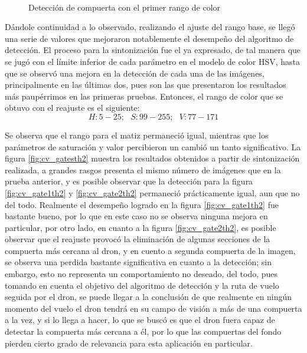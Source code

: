 \begin{figure}[ht]
    \centering
    \hfill
    \\
    \hfill
    \hfill

    \caption{Detección de compuerta con el primer rango de color}
    \label{fig:cv_gatesth1}
\end{figure}

Dándole continuidad a lo observado, realizando el ajuste del rango base, se llegó una serie de valores que mejoraron notablemente el desempeño del algoritmo de detección. El proceso para la sintonización fue el ya expresado, de tal manera que se jugó con el límite inferior de cada parámetro en el modelo de color HSV, hasta que se observó una mejora en la detección de cada una de las imágenes, principalmente en las últimas dos, pues son las que presentaron los resultados más paupérrimos en las primeras pruebas. Entonces, el rango de color que se obtuvo con el reajuste es el siguiente: \[H:5-25;\text{ } S:99-255;\text{ } V:77-171\]

Se observa que el rango para el matiz permaneció igual, mientras que los parámetros de saturación y valor percibieron un cambió un tanto significativo. La figura \ref{fig:cv_gatesth2} muestra los resultados obtenidos a partir de sintonización realizada, a grandes rasgos presenta el mismo número de imágenes que en la prueba anterior, y es posible observar que la detección para la figura \ref{fig:cv_gate1th2} y \ref{fig:cv_gate2th2} permaneció prácticamente igual, aun que no del todo. Realmente el desempeño logrado en la figura \ref{fig:cv_gate1th2} fue bastante bueno, por lo que en este caso no se observa ninguna mejora en particular, por otro lado, en cuanto a la figura \ref{fig:cv_gate2th2}, es posible observar que el reajuste provocó la eliminación de algunas secciones de la compuerta más cercana al dron, y en cuento a segunda compuerta de la imagen, se observa una perdida bastante significativa en cuanto a la detección; sin embargo, esto no representa un comportamiento no deseado, del todo, pues tomando en cuenta el objetivo del algoritmo de detección y la ruta de vuelo seguida por el dron, se puede llegar a la conclusión de que realmente en ningún momento del vuelo el dron tendrá en su campo de visión a más de una compuerta a la vez, y si lo llega a hacer, lo que se buscó es que el dron fuera capaz de detectar la compuerta más cercana a él, por lo que las compuertas del fondo pierden cierto grado de relevancia para esta aplicación en particular. 

